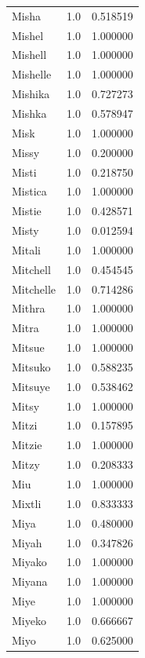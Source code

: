 \documentclass[
  letterpaper,
  DIV=11,
  numbers=noendperiod]{scrreprt}
\begin{document}
\begin{tabular}{lrr}
Misha           &   1.0 &   0.518519 \\
Mishel          &   1.0 &   1.000000 \\
Mishell         &   1.0 &   1.000000 \\
Mishelle        &   1.0 &   1.000000 \\
Mishika         &   1.0 &   0.727273 \\
Mishka          &   1.0 &   0.578947 \\
Misk            &   1.0 &   1.000000 \\
Missy           &   1.0 &   0.200000 \\
Misti           &   1.0 &   0.218750 \\
Mistica         &   1.0 &   1.000000 \\
Mistie          &   1.0 &   0.428571 \\
Misty           &   1.0 &   0.012594 \\
Mitali          &   1.0 &   1.000000 \\
Mitchell        &   1.0 &   0.454545 \\
Mitchelle       &   1.0 &   0.714286 \\
Mithra          &   1.0 &   1.000000 \\
Mitra           &   1.0 &   1.000000 \\
Mitsue          &   1.0 &   1.000000 \\
Mitsuko         &   1.0 &   0.588235 \\
Mitsuye         &   1.0 &   0.538462 \\
Mitsy           &   1.0 &   1.000000 \\
Mitzi           &   1.0 &   0.157895 \\
Mitzie          &   1.0 &   1.000000 \\
Mitzy           &   1.0 &   0.208333 \\
Miu             &   1.0 &   1.000000 \\
Mixtli          &   1.0 &   0.833333 \\
Miya            &   1.0 &   0.480000 \\
Miyah           &   1.0 &   0.347826 \\
Miyako          &   1.0 &   1.000000 \\
Miyana          &   1.0 &   1.000000 \\
Miye            &   1.0 &   1.000000 \\
Miyeko          &   1.0 &   0.666667 \\
Miyo            &   1.0 &   0.625000 \\

\end{tabular}
\end{document}

